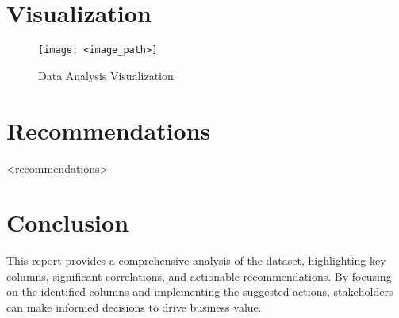 \documentclass[a4paper,12pt]{article}
\begin{document}
\section{Visualization}
\begin{figure}[h]
    \centering
    \texttt{[image: <image\_path>]}
    \caption{Data Analysis Visualization}
\end{figure}

\section{Recommendations}
\begin{itemize}
    <recommendations>
\end{itemize}

\section{Conclusion}
This report provides a comprehensive analysis of the dataset, highlighting key columns, significant correlations, and actionable recommendations. By focusing on the identified columns and implementing the suggested actions, stakeholders can make informed decisions to drive business value.
\end{document}
